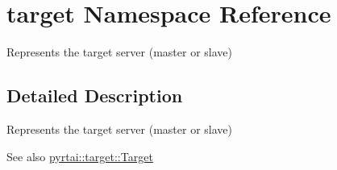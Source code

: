 \hypertarget{namespacetarget}{
\section{target \-Namespace \-Reference}
\label{namespacetarget}
}


\-Represents the target server (master or slave)  




\subsection{\-Detailed \-Description}
\-Represents the target server (master or slave) \begin{DoxySeeAlso}{\-See also}
\hyperlink{classpyrtai_1_1target_1_1_target}{pyrtai\-::target\-::\-Target} 
\end{DoxySeeAlso}
